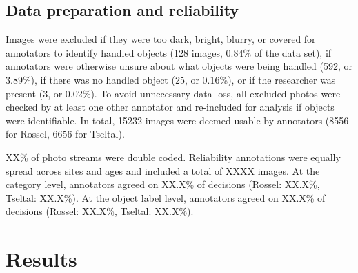 \documentclass[10pt, letterpaper]{article}
\begin{document}
\hypertarget{data-preparation-and-reliability}{%
\subsection{Data preparation and
reliability}\label{data-preparation-and-reliability}}

Images were excluded if they were too dark, bright, blurry, or covered
for annotators to identify handled objects (128 images, 0.84\% of the
data set), if annotators were otherwise unsure about what objects were
being handled (592, or 3.89\%), if there was no handled object (25, or
0.16\%), or if the researcher was present (3, or 0.02\%). To avoid
unnecessary data loss, all excluded photos were checked by at least one
other annotator and re-included for analysis if objects were
identifiable. In total, 15232 images were deemed usable by annotators
(8556 for Rossel, 6656 for Tseltal).

XX\% of photo streams were double coded. Reliability annotations were
equally spread across sites and ages and included a total of XXXX
images. At the category level, annotators agreed on XX.X\% of decisions
(Rossel: XX.X\%, Tseltal: XX.X\%). At the object label level, annotators
agreed on XX.X\% of decisions (Rossel: XX.X\%, Tseltal: XX.X\%).

\begin{table}[!ht]
\centering
{}
\caption{Non-study-related objects handled by the most children across categories and sites.} 
\label{tab:top-objects}
\end{table}

\hypertarget{results}{%
\section{Results}\label{results}}
\end{document}
